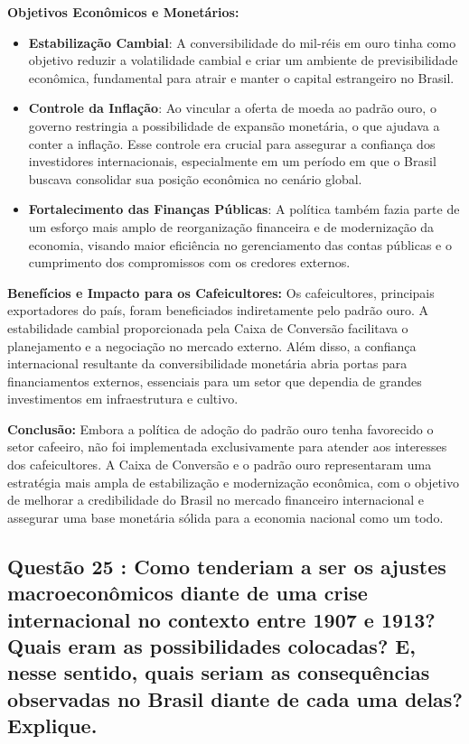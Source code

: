 \documentclass[a4paper,12pt]{article}[abntex2]
\begin{document}
\textbf{Objetivos Econômicos e Monetários:}
\begin{itemize}
    \item \textbf{Estabilização Cambial}: A conversibilidade do mil-réis em ouro tinha como objetivo reduzir a volatilidade cambial e criar um ambiente de previsibilidade econômica, fundamental para atrair e manter o capital estrangeiro no Brasil.
    \item \textbf{Controle da Inflação}: Ao vincular a oferta de moeda ao padrão ouro, o governo restringia a possibilidade de expansão monetária, o que ajudava a conter a inflação. Esse controle era crucial para assegurar a confiança dos investidores internacionais, especialmente em um período em que o Brasil buscava consolidar sua posição econômica no cenário global.
    \item \textbf{Fortalecimento das Finanças Públicas}: A política também fazia parte de um esforço mais amplo de reorganização financeira e de modernização da economia, visando maior eficiência no gerenciamento das contas públicas e o cumprimento dos compromissos com os credores externos.
\end{itemize}

\textbf{Benefícios e Impacto para os Cafeicultores:}
Os cafeicultores, principais exportadores do país, foram beneficiados indiretamente pelo padrão ouro. A estabilidade cambial proporcionada pela Caixa de Conversão facilitava o planejamento e a negociação no mercado externo. Além disso, a confiança internacional resultante da conversibilidade monetária abria portas para financiamentos externos, essenciais para um setor que dependia de grandes investimentos em infraestrutura e cultivo.

\textbf{Conclusão:}
Embora a política de adoção do padrão ouro tenha favorecido o setor cafeeiro, não foi implementada exclusivamente para atender aos interesses dos cafeicultores. A Caixa de Conversão e o padrão ouro representaram uma estratégia mais ampla de estabilização e modernização econômica, com o objetivo de melhorar a credibilidade do Brasil no mercado financeiro internacional e assegurar uma base monetária sólida para a economia nacional como um todo.

\subsection{\textbf{Questão 25 : Como tenderiam a ser os ajustes macroeconômicos diante de uma crise internacional no contexto entre 1907 e 1913? Quais eram as possibilidades colocadas? E, nesse sentido, quais seriam as consequências observadas no Brasil diante de cada uma delas? Explique.}}
\end{document}
